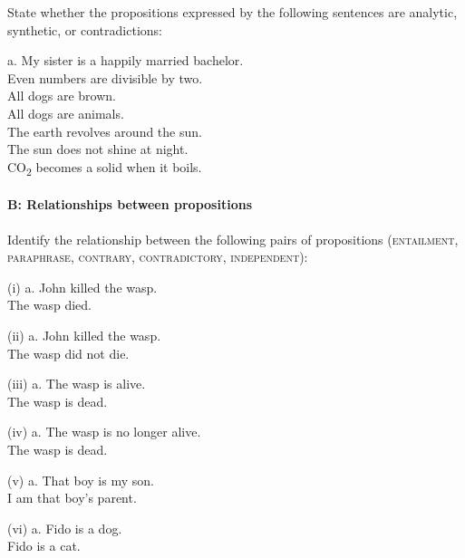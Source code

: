 State whether the propositions expressed by the following sentences are analytic, synthetic, or contradictions:

\ea
  a. My sister is a happily married bachelor.\\
\ex Even numbers are divisible by two.\\
\ex All dogs are brown.\\
\ex All dogs are animals.\\
\ex The earth revolves around the sun.\\
\ex The sun does not shine at night.\\
\ex CO\textsubscript{2} becomes a solid when it boils.
\z

\paragraph{B: Relationships between propositions}

Identify the relationship between the following pairs of propositions (\textsc{entailment, paraphrase, contrary,} \textsc{contradictory,} \textsc{independent}):

\begin{stylepoints}
(i)  a. John killed the wasp.\\
\ex The wasp died.
\end{stylepoints}

\begin{stylepoints}
(ii)  a. John killed the wasp.\\
\ex The wasp did not die.
\end{stylepoints}

\begin{stylepoints}
(iii)  a. The wasp is alive.\\
\ex The wasp is dead.
\end{stylepoints}

\begin{stylepoints}
(iv)  a. The wasp is no longer alive.\\
\ex The wasp is dead.
\end{stylepoints}

\begin{stylepoints}
(v)  a. That boy is my son.\\
\ex I am that boy’s parent.
\end{stylepoints}

\begin{stylepoints}
(vi)  a. Fido is a dog.\\
\ex Fido is a cat.
\end{stylepoints}

